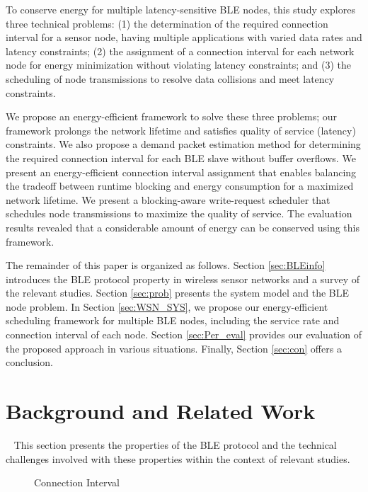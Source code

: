 \documentclass[10pt,journal,compsoc]{IEEEtran}
\begin{document}
To conserve energy for multiple latency-sensitive BLE nodes, this study explores three technical problems: (1) the determination of the required connection interval for a sensor node, having multiple applications with varied data rates and latency constraints; (2) the assignment of a connection interval for each network node for energy minimization without violating latency constraints; and (3) the scheduling of node transmissions to resolve data collisions and meet latency constraints.

We propose an energy-efficient framework to solve these three problems; our framework prolongs the network lifetime and satisfies quality of service (latency) constraints. We also propose a demand packet estimation method for determining the required connection interval for each BLE slave without buffer overflows. We present an energy-efficient connection interval assignment that enables balancing the tradeoff between runtime blocking and energy consumption for a maximized network lifetime. We present a blocking-aware write-request scheduler that schedules node transmissions to maximize the quality of service. The evaluation results revealed that a considerable amount of energy can be conserved using this framework.



The remainder of this paper is organized as follows. Section \ref{sec:BLEinfo} introduces the BLE protocol property in wireless sensor networks and a survey of the relevant studies. Section \ref{sec:prob} presents the system model and the BLE node problem. In Section \ref{sec:WSN_SYS}, we propose our energy-efficient scheduling framework for multiple BLE nodes, including the service rate and connection interval of each node. Section \ref{sec:Per_eval} provides our evaluation of the proposed approach in various situations.
Finally, Section \ref{sec:con} offers a conclusion.


\section{Background and Related Work}~\label{sec:BLEinfo}
This section presents the properties of the BLE protocol and the technical challenges involved with these properties within the context of relevant studies.

\begin{figure*}[tbhp!!]
\begin{minipage}[b]{\linewidth}
\vspace{-0.5em}
\centering
{}\vspace{-0.5em}
\caption{Connection Interval} %
\end{minipage}
\end{figure*}
\end{document}
